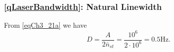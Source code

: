 \chapter{}

\section{}

\subsection{\ref{qLaserBandwidth}: Natural Linewidth}
From \eqref{eqCh3_21a}
we have
\[
D = \frac{A}{2 \bar{n}_{st}} = \frac{10^6}{2 \cdot 10^6} = 0.5 \text{Hz.}
\]

